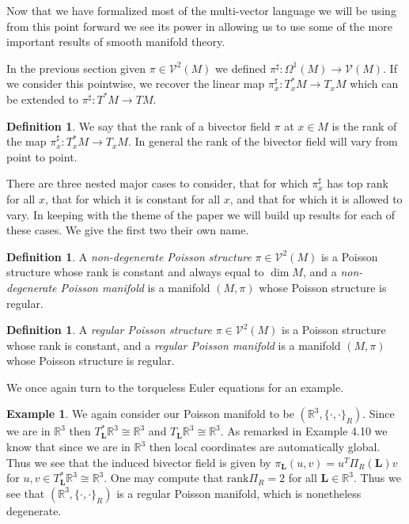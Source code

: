 \documentclass[psamsfonts,12pt]{amsart}
\newcommand\0{\mathbf{0}}
\theoremstyle{plain}
\theoremstyle{definition}
\newtheorem{dfn}[thm]{Definition} %
\newtheorem{ex}[thm]{Example} %
\newcommand{\bL}{\mathbf{L}}
\newcommand{\bbR}{\mathbb{R}}
\newcommand{\sV}{\mathcal{V}}
\begin{document}
Now that we have formalized most of the multi-vector language we will be using from this point forward we see its power in allowing us to use some of the more important results of smooth manifold theory.


In the previous section given $\pi \in \sV^2(M)$ we defined $\pi^\sharp \colon \Omega^1(M)\rightarrow \sV(M)$.  If we consider this pointwise, we recover the linear map $\pi^\sharp_x \colon T^*_xM\rightarrow T_x M$ which can be extended to $\pi^\sharp \colon T^*M\rightarrow TM$.

\begin{dfn}
We say that the rank of a bivector field $\pi$ at $x\in M$ is the rank of the map $\pi^\sharp_x \colon T^*_xM\rightarrow T_x M$.  In general the rank of the bivector field will vary from point to point.
\end{dfn}

There are three nested major cases to consider, that for which $\pi^\sharp_x$ has top rank for all $x$, that for which it is constant for all $x$, and that for which it is allowed to vary.  In keeping with the theme of the paper we will build up results for each of these cases.  We give the first two their own name.

\begin{dfn}
A \textit{non-degenerate Poisson structure} $\pi\in \sV^2(M)$ is a Poisson structure whose rank is constant and always equal to $\dim M$, and a \textit{non-degenerate Poisson manifold} is a manifold $(M,\pi)$ whose Poisson structure is regular.
\end{dfn}

\begin{dfn}
A \textit{regular Poisson structure} $\pi \in \sV^2(M)$ is a Poisson structure whose rank is constant, and a 
\textit{regular Poisson manifold} is a manifold $(M,\pi)$ whose Poisson structure is regular.
\end{dfn}

We once again turn to the torqueless Euler equations for an example.

\begin{ex}
We again consider our Poisson manifold to be $(\bbR^3, \{\cdot, \cdot \}_R)$.  Since we are in $\bbR^3$ then $T_\bL^*\bbR^3 \cong \bbR^3$ and $T_\bL\bbR^3 \cong \bbR^3$.  As remarked in Example 4.10 we know that since we are in $\bbR^3$ then local coordinates are automatically global.  Thus we see that the induced bivector field is given by $\pi_\bL(u,v)=u^T \Pi_R(\bL) v$ for $u,v\in T^*_\bL \bbR^3 \cong \bbR^3$.  One may compute that $\text{rank}\Pi_R=2$ for all $\bL\in \bbR^3$.  Thus we see that $(\bbR^3,\{\cdot,\cdot\}_R)$ is a regular Poisson manifold, which is nonetheless degenerate.
\end{ex}
\end{document}
